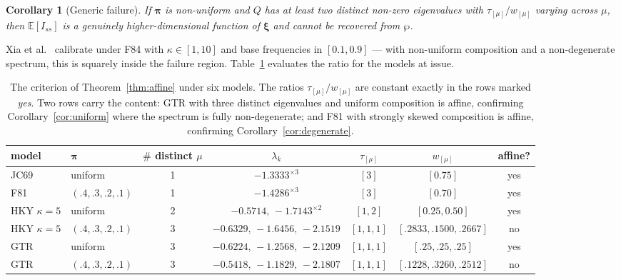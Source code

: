 \documentclass[11pt]{article}
\newcommand{\Iss}{I_{ss}}
\newcommand{\bpi}{\boldsymbol{\pi}}
\newcommand{\bxi}{\boldsymbol{\xi}}
\newcommand{\E}{\mathbb{E}}
\newtheorem{corollary}[theorem]{Corollary}
\theoremstyle{definition}
\theoremstyle{remark}
\begin{document}
\begin{corollary}[Generic failure]
\label{cor:failure}
If $\bpi$ is non-uniform \emph{and} $Q$ has at least two distinct non-zero
eigenvalues with $\tau_{[\mu]}/w_{[\mu]}$ varying across $\mu$, then $\E[\Iss]$
is a genuinely higher-dimensional function of $\bxi$ and cannot be recovered
from $\wp$.
\end{corollary}

Xia et al.~\citep{xia2003iss} calibrate under F84 with
$\kappa\in[1,10]$ and base frequencies in $[0.1,0.9]$ --- with non-uniform
composition and a non-degenerate spectrum, this is squarely inside the failure
region. Table~\ref{tab:criterion} evaluates the ratio for the models at issue.

\begin{table}[t]
\centering
\small
\setlength{\tabcolsep}{4pt}
\begin{tabular}{llccccc}
\toprule
model & $\bpi$ & $\#$ distinct $\mu$ & $\lambda_k$
      & $\tau_{[\mu]}$ & $w_{[\mu]}$ & affine? \\
\midrule
JC69            & uniform          & 1 & $-1.3333^{\times3}$ & $[3]$ & $[0.75]$ & yes \\
F81             & $(.4,.3,.2,.1)$  & 1 & $-1.4286^{\times3}$ & $[3]$ & $[0.70]$ & yes \\
HKY $\kappa{=}5$& uniform          & 2 & $-0.5714,\,-1.7143^{\times2}$ & $[1,2]$ & $[0.25,0.50]$ & yes \\
HKY $\kappa{=}5$& $(.4,.3,.2,.1)$  & 3 & $-0.6329,\,-1.6456,\,-2.1519$ & $[1,1,1]$ & $[.2833,.1500,.2667]$ & no \\
GTR             & uniform          & 3 & $-0.6224,\,-1.2568,\,-2.1209$ & $[1,1,1]$ & $[.25,.25,.25]$ & yes \\
GTR             & $(.4,.3,.2,.1)$  & 3 & $-0.5418,\,-1.1829,\,-2.1807$ & $[1,1,1]$ & $[.1228,.3260,.2512]$ & no \\
\bottomrule
\end{tabular}
\caption{The criterion of Theorem~\ref{thm:affine} under six models. The
ratios $\tau_{[\mu]}/w_{[\mu]}$ are constant exactly in the rows marked
\emph{yes}. Two rows carry the content: GTR with three distinct eigenvalues
and uniform composition is affine, confirming
Corollary~\ref{cor:uniform} where the spectrum is fully non-degenerate; and
F81 with strongly skewed composition is affine, confirming
Corollary~\ref{cor:degenerate}.}
\label{tab:criterion}
\end{table}
\end{document}
